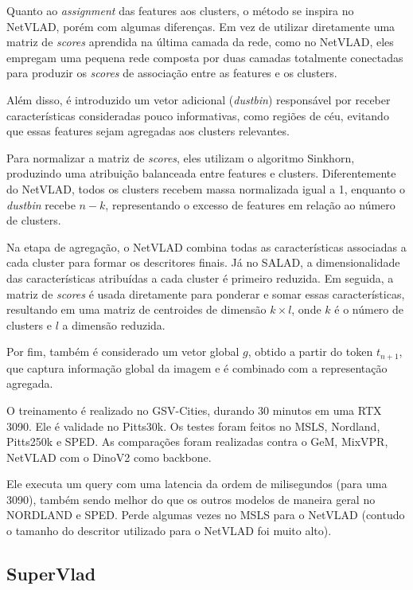 \documentclass[letterpaper, 10 pt, conference]{ieeeconf}  %
\begin{document}
Quanto ao \textit{assignment} das features aos clusters, o método se inspira no NetVLAD, porém com algumas diferenças. Em vez de utilizar diretamente uma matriz de \textit{scores} aprendida na última camada da rede, como no NetVLAD, eles empregam uma pequena rede composta por duas camadas totalmente conectadas para produzir os \textit{scores} de associação entre as features e os clusters.

Além disso, é introduzido um vetor adicional (\textit{dustbin}) responsável por receber características consideradas pouco informativas, como regiões de céu, evitando que essas features sejam agregadas aos clusters relevantes.

Para normalizar a matriz de \textit{scores}, eles utilizam o algoritmo Sinkhorn, produzindo uma atribuição balanceada entre features e clusters. Diferentemente do NetVLAD, todos os clusters recebem massa normalizada igual a 1, enquanto o \textit{dustbin} recebe \(n-k\), representando o excesso de features em relação ao número de clusters.

Na etapa de agregação, o NetVLAD combina todas as características associadas a cada cluster para formar os descritores finais. Já no SALAD, a dimensionalidade das características atribuídas a cada cluster é primeiro reduzida. Em seguida, a matriz de \textit{scores} é usada diretamente para ponderar e somar essas características, resultando em uma matriz de centroides de dimensão \(k \times l\), onde \(k\) é o número de clusters e \(l\) a dimensão reduzida.

Por fim, também é considerado um vetor global \(g\), obtido a partir do token \(t_{n+1}\), que captura informação global da imagem e é combinado com a representação agregada.

O treinamento é realizado no GSV-Cities, durando 30 minutos em uma RTX 3090. Ele é validade no Pitts30k. Os testes foram feitos no MSLS, Nordland, Pitts250k e SPED. As comparações foram realizadas contra o GeM, MixVPR, NetVLAD com o DinoV2 como backbone.

Ele executa um query com uma latencia da ordem de milisegundos (para uma 3090), também sendo melhor do que os outros modelos de maneira geral no NORDLAND e SPED. Perde algumas vezes no MSLS para o NetVLAD (contudo o tamanho do descritor utilizado para o NetVLAD foi muito alto).

\subsection{SuperVlad}
\end{document}
